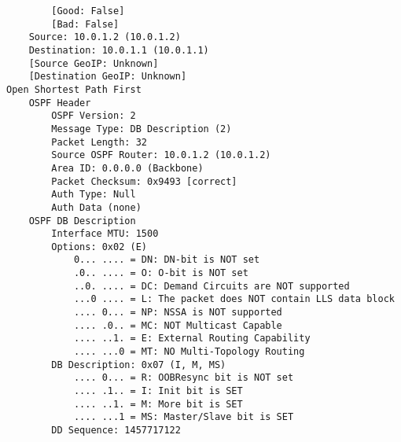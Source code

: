 \begin{lstlisting}
        [Good: False]
        [Bad: False]
    Source: 10.0.1.2 (10.0.1.2)
    Destination: 10.0.1.1 (10.0.1.1)
    [Source GeoIP: Unknown]
    [Destination GeoIP: Unknown]
Open Shortest Path First
    OSPF Header
        OSPF Version: 2
        Message Type: DB Description (2)
        Packet Length: 32
        Source OSPF Router: 10.0.1.2 (10.0.1.2)
        Area ID: 0.0.0.0 (Backbone)
        Packet Checksum: 0x9493 [correct]
        Auth Type: Null
        Auth Data (none)
    OSPF DB Description
        Interface MTU: 1500
        Options: 0x02 (E)
            0... .... = DN: DN-bit is NOT set
            .0.. .... = O: O-bit is NOT set
            ..0. .... = DC: Demand Circuits are NOT supported
            ...0 .... = L: The packet does NOT contain LLS data block
            .... 0... = NP: NSSA is NOT supported
            .... .0.. = MC: NOT Multicast Capable
            .... ..1. = E: External Routing Capability
            .... ...0 = MT: NO Multi-Topology Routing
        DB Description: 0x07 (I, M, MS)
            .... 0... = R: OOBResync bit is NOT set
            .... .1.. = I: Init bit is SET
            .... ..1. = M: More bit is SET
            .... ...1 = MS: Master/Slave bit is SET
        DD Sequence: 1457717122
\end{lstlisting}

